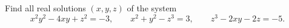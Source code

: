 Find all real solutions $(x,y,z)$ of the system
\[x^2y^2-4xy+z^2=-3,\qquad x^2+y^2-z^3=3,\qquad z^3-2xy-2z=-5.\]
